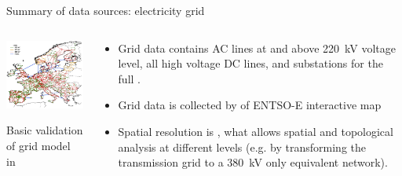 \begin{frame}{Summary of data sources: electricity grid}
 
  \begin{columns}[T]
  \begin{column}{7cm}

  \vspace{0.3cm}
  \centering

  \includegraphics[width=7cm]{images/pypsa-eur-grid.png}

  {\footnotesize 
  \vspace{.1cm}
  Basic validation of grid model in 
  }
  \end{column}

  \begin{column}{7.5cm}
  {\small 
  \vspace{.3cm}
  \begin{itemize}
    \item Grid data contains AC lines at and above 220~kV voltage level, 
    all high voltage DC lines, and substations for the full 
    .
    \item Grid data is collected by  
    of ENTSO-E interactive map
    \item Spatial resolution is
    , 
    what allows spatial and topological analysis at different levels 
    (e.g. by transforming the transmission grid to a 380~kV only equivalent network).

  \end{itemize}
  }
  
  \end{column}
  \end{columns}

\end{frame}



